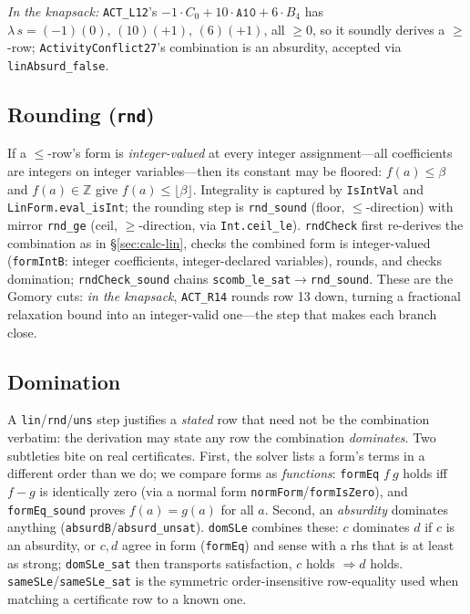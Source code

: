 \documentclass[runningheads]{llncs}
\newcommand{\code}[1]{\texttt{#1}}
\newcommand{\Z}{\mathbb{Z}}
\begin{document}
\emph{In the knapsack:} \code{ACT\_L12}'s $-1\cdot C_0+10\cdot\code{A10}+6\cdot B_4$ has
$\lambda\,s = (-1)(0),\,(10)(+1),\,(6)(+1)$, all $\ge0$, so it soundly derives a
$\ge$-row; \code{ActivityConflict27}'s combination is an absurdity, accepted via
\code{linAbsurd\_false}.

\subsection{Rounding (\code{rnd})}\label{sec:calc-rnd}
If a $\le$-row's form is \emph{integer-valued} at every integer assignment---all
coefficients are integers on integer variables---then its constant may be floored:
$f(a)\le\beta$ and $f(a)\in\Z$ give $f(a)\le\lfloor\beta\rfloor$. Integrality is
captured by \code{IsIntVal} and \code{LinForm.eval\_isInt}; the rounding step is
\code{rnd\_sound} (floor, $\le$-direction) with mirror \code{rnd\_ge} (ceil,
$\ge$-direction, via \code{Int.ceil\_le}). \code{rndCheck} first re-derives the
combination as in \S\ref{sec:calc-lin}, checks the combined form is integer-valued
(\code{formIntB}: integer coefficients, integer-declared variables), rounds, and checks
domination; \code{rndCheck\_sound} chains \code{scomb\_le\_sat}$\to$\code{rnd\_sound}.
These are the Gomory cuts: \emph{in the knapsack}, \code{ACT\_R14} rounds row 13 down,
turning a fractional relaxation bound into an integer-valid one---the step that makes
each branch close.

\subsection{Domination}\label{sec:calc-dom}
A \code{lin}/\code{rnd}/\code{uns} step justifies a \emph{stated} row that need not be the
combination verbatim: the derivation may state any row the combination \emph{dominates}.
Two subtleties bite on real certificates. First, the solver lists a form's terms in a
different order than we do; we compare forms as \emph{functions}: \code{formEq} $f\ g$
holds iff $f-g$ is identically zero (via a normal form \code{normForm}/\code{formIsZero}),
and \code{formEq\_sound} proves $f(a)=g(a)$ for all $a$. Second, an \emph{absurdity}
dominates anything (\code{absurdB}/\code{absurd\_unsat}). \code{domSLe} combines these:
$c$ dominates $d$ if $c$ is an absurdity, or $c,d$ agree in form (\code{formEq}) and sense
with a rhs that is at least as strong; \code{domSLe\_sat} then transports satisfaction,
$c$ holds $\Rightarrow d$ holds. \code{sameSLe}/\code{sameSLe\_sat} is the symmetric
order-insensitive row-equality used when matching a certificate row to a known one.
\end{document}
